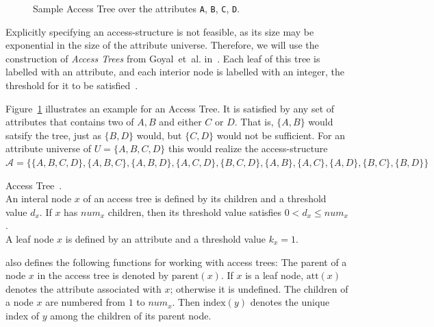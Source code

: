 \begin{figure}
    \centering
    \caption[Sample Access Tree]{
        Sample Access Tree over the attributes \texttt{A}, \texttt{B}, \texttt{C}, \texttt{D}.
    }
    \label{fig:sample-access-tree}
\end{figure}
Explicitly specifying an \gls{access-structure} is not feasible, as its size may be exponential in the size of the attribute universe.
Therefore, we will use the construction of \emph{Access Trees} from Goyal~et~al. in~\cite{goyal_attribute-based_2006}.
Each leaf of this tree is labelled with an attribute, and each interior node is labelled with an integer, the threshold for it to be satisfied~\cite{goyal_attribute-based_2006}.

Figure~\ref{fig:sample-access-tree} illustrates an example for an Access Tree. It is satisfied by any set of attributes that contains two of $A, B$ and either $C$ or $D$.
That is, $\{A,B\}$ would satsify the tree, just as $\{B, D\}$ would, but $\{C, D\}$ would not be sufficient.
For an attribute universe of $U = \{A, B, C, D\}$ this would realize the \gls{access-structure} $\mathcal{A} = \{\{A, B, C, D\}, \{A, B, C\}, \{A, B, D\},\{A, C, D\}, \{B, C, D\}, \{A, B\},\{A, C\},\{A,D\}, \{B, C\},\{B, D\}\}$

\begin{definition}
    Access Tree~\cite{goyal_attribute-based_2006}.\\
    An interal node $x$ of an access tree is defined by its children and a threshold value $d_x$. If $x$ has $num_x$ children, then its threshold value satisfies $0 < d_x \leq num_x$.\\
    A leaf node $x$ is defined by an attribute and a threshold value $k_x = 1$.

    \cite{goyal_attribute-based_2006} also defines the following functions for working with access trees:
    The parent of a node $x$ in the access tree is denoted by $\text{parent}(x)$.
    If $x$ is a leaf node, $\text{att}(x)$ denotes the attribute associated with $x$; otherwise it is undefined.
    The children of a node $x$ are numbered from $1$ to $num_x$. Then $\text{index}(y)$ denotes the unique index of $y$ among the children of its parent node.
\end{definition}

